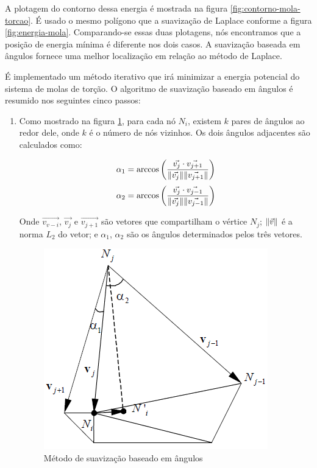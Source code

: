A plotagem do contorno dessa energia é mostrada na figura \ref{fig:contorno-mola-torcao}. É usado o mesmo polígono que a suavização de Laplace conforme a figura \ref{fig:energia-mola}. Comparando-se essas duas plotagens, nós encontramos que a posição de energia mínima é diferente nos dois casos. A suavização baseada em ângulos fornece uma melhor localização em relação ao método de Laplace.

É implementado um método iterativo que irá minimizar a energia potencial do sistema de molas de torção. O algoritmo de suavização baseado em ângulos é resumido nos seguintes cinco passos:

\begin{enumerate}
    \item Como mostrado na figura \ref{fig:angle-based}, para cada nó $N_i$, existem $k$ pares de ângulos ao redor dele, onde $k$ é o número de nós vizinhos. Os dois ângulos adjacentes são calculados como:
    
    \begin{equation*}
        \alpha_1 = \arccos{\qty(\frac{\vec{v_j} \cdot \vec{v_{j+1}}}{\norm{\vec{v_j}} \norm{\vec{v_{j+1}}} })}
    \end{equation*}
    \begin{equation*}
        \alpha_2 = \arccos{\qty(\frac{\vec{v_j} \cdot \vec{v_{j-1}}}{\norm{\vec{v_j}} \norm{\vec{v_{j-1}}} })}
    \end{equation*}

    Onde $\vec{v_{v-i}}$, $\vec{v_j}$ e $\vec{v_{j+1}}$ são vetores que compartilham o vértice $N_j$; $\norm{\vec{v}}$ é a norma $L_2$ do vetor; e $\alpha_1$, $\alpha_2$ são os ângulos determinados pelos três vetores.

    \begin{figure}[]
        \centering
        \includegraphics{fig/angle-based.png}
        \caption{Método de suavização baseado em ângulos}
        \label{fig:angle-based}
    \end{figure}


\end{enumerate}
